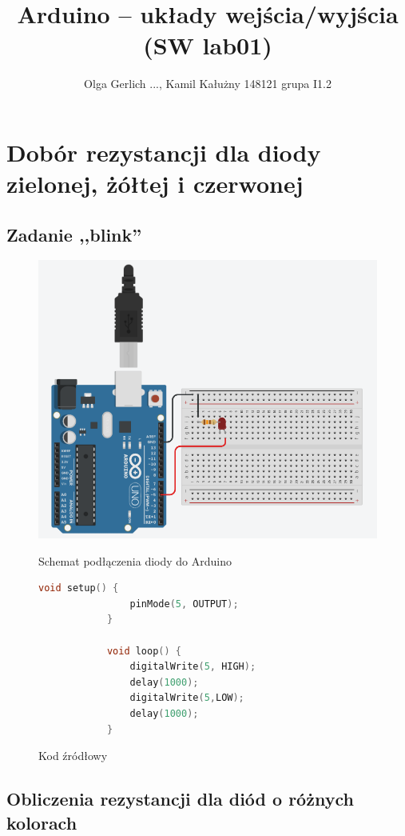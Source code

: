 \documentclass[12pt]{article}
\title{Arduino – układy wejścia/wyjścia (SW lab01)}
\author{Olga Gerlich ..., Kamil Kałużny 148121 grupa I1.2}
\begin{document}
	\maketitle
	\section{Dobór rezystancji dla diody zielonej, żółtej i czerwonej}
	\subsection{Zadanie ,,blink''}
	\begin{figure}[h!]
		\begin{center}
			\includegraphics[scale=0.4]{01_blink.png}
			\caption*{Schemat podłączenia diody do Arduino}
		\end{center}
		\begin{lstlisting}[language=C++]
			void setup() {
				pinMode(5, OUTPUT);
			}
			
			void loop() {
				digitalWrite(5, HIGH);
				delay(1000);
				digitalWrite(5,LOW);
				delay(1000);
			}
		\end{lstlisting}
		\caption*{Kod źródłowy}
	\end{figure}
	\subsection{Obliczenia rezystancji dla diód o różnych kolorach}
\end{document}
